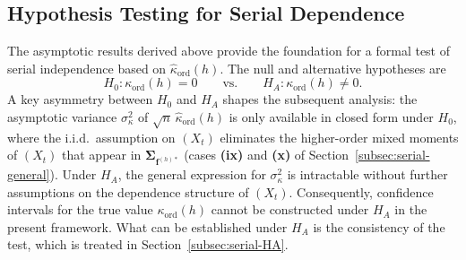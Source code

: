 ﻿\documentclass[12pt,a4paper]{scrreprt}
\theoremstyle{definition}
\begin{document}
\subsection{Hypothesis Testing for Serial Dependence}
\label{subsec:serial-testing}
The asymptotic results derived above provide the foundation for a
formal test of serial independence based on $\hat{\kappa}_{\mathrm{ord}}(h)$.
The null and alternative hypotheses are
\[
    H_0: \kappa_{\mathrm{ord}}(h) = 0
    \qquad \text{vs.} \qquad
    H_A: \kappa_{\mathrm{ord}}(h) \neq 0.
\]
A key asymmetry between $H_0$ and $H_A$ shapes the subsequent
analysis: the asymptotic variance $\sigma^2_\kappa$ of
$\sqrt{n}\,\hat{\kappa}_{\mathrm{ord}}(h)$ is only available in
closed form under $H_0$, where the i.i.d.\ assumption on $(X_t)$
eliminates the higher-order mixed moments of $(X_t)$ that appear
in $\boldsymbol{\Sigma}_{\boldsymbol{f}^{(h)*}}$ (cases
\textbf{(ix)} and \textbf{(x)} of
Section~\ref{subsec:serial-general}). Under $H_A$, the general
expression for $\sigma^2_\kappa$ is intractable without further
assumptions on the dependence structure of $(X_t)$. Consequently,
confidence intervals for the true value $\kappa_{\mathrm{ord}}(h)$
cannot be constructed under $H_A$ in the present framework.
What can be established under $H_A$ is the consistency of the test,
which is treated in Section~\ref{subsec:serial-HA}.
\end{document}
